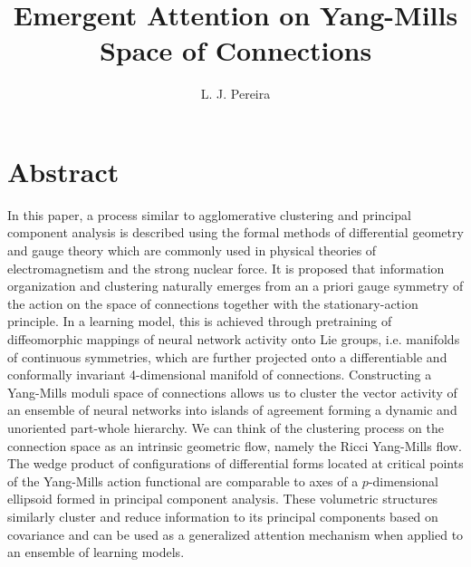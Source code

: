 \documentclass{article}
\title{ Emergent Attention on 
Yang-Mills \\Space of Connections}
\author{%
  L. J. Pereira \\
}
\newcommand{\stoptocwriting}{%
  \addtocontents{toc}{\protect\setcounter{tocdepth}{-5}}}
\begin{document}
\setlength{\abovedisplayskip}{4pt}
\setlength{\belowdisplayskip}{4pt}

\vspace{-2cm}
\maketitle


\renewcommand{\baselinestretch}{1.0}\normalsize
\section*{Abstract}
In this paper, a process similar to agglomerative clustering and principal component analysis is described using the formal methods of differential geometry and gauge theory which are commonly used in physical theories of electromagnetism and the strong nuclear force.
It is proposed that information organization and clustering naturally emerges from an a priori gauge symmetry of the action on the space of connections together with the stationary-action principle. In a learning model, this is achieved through pretraining of diffeomorphic mappings of neural network activity onto Lie groups, i.e. manifolds of continuous symmetries, which are further projected onto a differentiable and conformally invariant 4-dimensional manifold of connections. 
Constructing a Yang-Mills moduli space of connections allows us to cluster the vector activity of an ensemble of neural networks into islands of agreement forming a dynamic and unoriented part-whole hierarchy.
We can think of the clustering process on the connection space as an intrinsic geometric flow, namely the Ricci Yang-Mills flow.
The wedge product of configurations of differential forms located at critical points of the Yang-Mills action functional are comparable to axes of a $p$-dimensional ellipsoid formed in principal component analysis. These volumetric structures similarly cluster and reduce information to its principal components based on covariance and can be used as a generalized attention mechanism when applied to an ensemble of learning models. 
\end{document}
